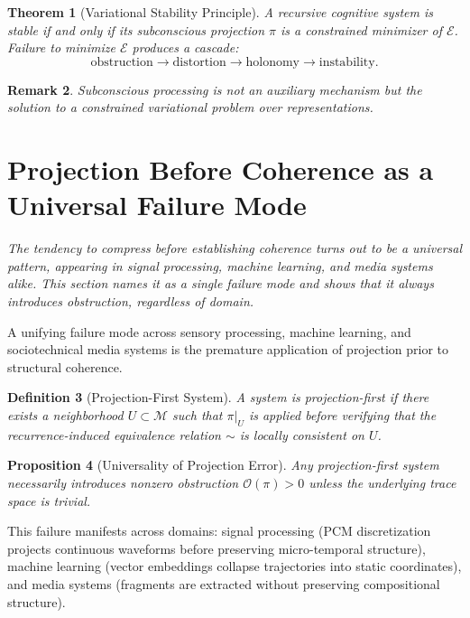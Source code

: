 \documentclass[12pt,a4paper]{article}
\newtheorem{theorem}{Theorem}[section]
\newtheorem{proposition}[theorem]{Proposition}
\newtheorem{definition}[theorem]{Definition}
\newtheorem{remark}[theorem]{Remark}
\begin{document}
\begin{theorem}[Variational Stability Principle]
A recursive cognitive system is stable if and only if its subconscious projection $\pi$ is a constrained minimizer of $\mathcal{E}$. Failure to minimize $\mathcal{E}$ produces a cascade:
\[
\text{obstruction} \to \text{distortion} \to \text{holonomy} \to \text{instability}.
\]
\end{theorem}

\begin{remark}
Subconscious processing is not an auxiliary mechanism but the solution to a constrained variational problem over representations.
\end{remark}

\section{Projection Before Coherence as a Universal Failure Mode}
\label{sec:projection_first}

\textit{The tendency to compress before establishing coherence turns out to be a universal pattern, appearing in signal processing, machine learning, and media systems alike. This section names it as a single failure mode and shows that it always introduces obstruction, regardless of domain.}

A unifying failure mode across sensory processing, machine learning, and sociotechnical media systems is the premature application of projection prior to structural coherence.

\begin{definition}[Projection-First System]
A system is projection-first if there exists a neighborhood $U \subset \mathcal{M}$ such that $\pi|_U$ is applied before verifying that the recurrence-induced equivalence relation $\sim$ is locally consistent on $U$.
\end{definition}

\begin{proposition}[Universality of Projection Error]
Any projection-first system necessarily introduces nonzero obstruction $\mathcal{O}(\pi) > 0$ unless the underlying trace space is trivial.
\end{proposition}

This failure manifests across domains: signal processing (PCM discretization projects continuous waveforms before preserving micro-temporal structure), machine learning (vector embeddings collapse trajectories into static coordinates), and media systems (fragments are extracted without preserving compositional structure).
\end{document}
